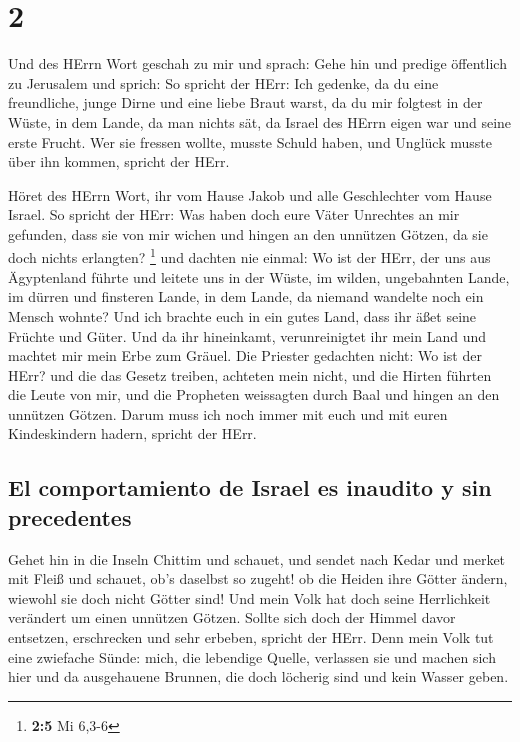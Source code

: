 \hypertarget{section-1}{%
\section{2}\label{section-1}}

 Und des HErrn Wort geschah zu mir und sprach:
 Gehe hin und predige öffentlich zu Jerusalem und sprich:
So spricht der HErr: Ich gedenke, da du eine freundliche, junge Dirne
und eine liebe Braut warst, da du mir folgtest in der Wüste, in dem
Lande, da man nichts sät,  da Israel des HErrn eigen war
und seine erste Frucht. Wer sie fressen wollte, musste Schuld haben, und
Unglück musste über ihn kommen, spricht der HErr.

 Höret des HErrn Wort, ihr vom Hause Jakob und alle
Geschlechter vom Hause Israel.  So spricht der HErr: Was
haben doch eure Väter Unrechtes an mir gefunden, dass sie von mir wichen
und hingen an den unnützen Götzen, da sie doch nichts erlangten?
\footnote{\textbf{2:5} Mi 6,3-6}  und dachten nie einmal:
Wo ist der HErr, der uns aus Ägyptenland führte und leitete uns in der
Wüste, im wilden, ungebahnten Lande, im dürren und finsteren Lande, in
dem Lande, da niemand wandelte noch ein Mensch wohnte? 
Und ich brachte euch in ein gutes Land, dass ihr äßet seine Früchte und
Güter. Und da ihr hineinkamt, verunreinigtet ihr mein Land und machtet
mir mein Erbe zum Gräuel.  Die Priester gedachten nicht:
Wo ist der HErr? und die das Gesetz treiben, achteten mein nicht, und
die Hirten führten die Leute von mir, und die Propheten weissagten durch
Baal und hingen an den unnützen Götzen.  Darum muss ich
noch immer mit euch und mit euren Kindeskindern hadern, spricht der
HErr.

\hypertarget{el-comportamiento-de-israel-es-inaudito-y-sin-precedentes}{%
\subsection{El comportamiento de Israel es inaudito y sin
precedentes}\label{el-comportamiento-de-israel-es-inaudito-y-sin-precedentes}}

 Gehet hin in die Inseln Chittim und schauet, und sendet
nach Kedar und merket mit Fleiß und schauet, ob's daselbst so zugeht!
 ob die Heiden ihre Götter ändern, wiewohl sie doch nicht
Götter sind! Und mein Volk hat doch seine Herrlichkeit verändert um
einen unnützen Götzen.  Sollte sich doch der Himmel davor
entsetzen, erschrecken und sehr erbeben, spricht der HErr.
 Denn mein Volk tut eine zwiefache Sünde: mich, die
lebendige Quelle, verlassen sie und machen sich hier und da ausgehauene
Brunnen, die doch löcherig sind und kein Wasser geben.

